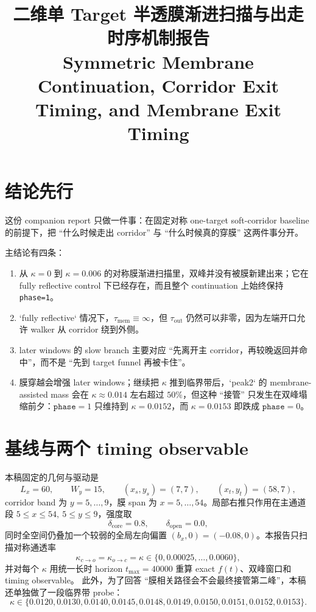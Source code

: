 \documentclass[11pt,fontset=fandol]{ctexart}
\title{二维单 Target 半透膜渐进扫描与出走时序机制报告\\\large Symmetric Membrane Continuation, Corridor Exit Timing, and Membrane Exit Timing}
\author{}
\date{}
\begin{document}
\maketitle

\section*{结论先行}
这份 companion report 只做一件事：在固定对称 one-target soft-corridor baseline 的前提下，把 ``什么时候走出 corridor'' 与 ``什么时候真的穿膜'' 这两件事分开。

主结论有四条：
\begin{enumerate}
  \item 从 \(\kappa=0\) 到 \(\kappa=0.006\) 的对称膜渐进扫描里，双峰并没有被膜新建出来；它在 fully reflective control 下已经存在，而且整个 continuation 上始终保持 \texttt{phase=1}。
  \item `fully reflective` 情况下，\(\tau_{\mathrm{mem}}\equiv\infty\)，但 \(\tau_{\mathrm{out}}\) 仍然可以非零，因为左端开口允许 walker 从 corridor 绕到外侧。
  \item later windows 的 slow branch 主要对应 ``先离开主 corridor，再较晚返回并命中''，而不是 ``先到 target funnel 再被卡住''。
  \item 膜穿越会增强 later windows；继续把 \(\kappa\) 推到临界带后，`peak2` 的 membrane-assisted mass 会在 \(\kappa\approx 0.014\) 左右超过 \(50\%\)，但这种 ``接管'' 只发生在双峰塌缩前夕：\(\texttt{phase}=1\) 只维持到 \(\kappa=0.0152\)，而 \(\kappa=0.0153\) 即跌成 \(\texttt{phase}=0\)。
\end{enumerate}

\section{基线与两个 timing observable}
本稿固定的几何与驱动是
\[
L_x=60,\qquad W_y=15,\qquad (x_s,y_s)=(7,7),\qquad (x_t,y_t)=(58,7),
\]
corridor band 为 \(y=5,\dots,9\)，膜 span 为 \(x=5,\dots,54\)。局部右推只作用在主通道段 \(5\le x\le 54,\ 5\le y\le 9\)，强度取
\[
\delta_{\mathrm{core}}=0.8,\qquad \delta_{\mathrm{open}}=0.0,
\]
同时全空间仍叠加一个较弱的全局左向偏置 \((b_x,0)=(-0.08,0)\)。本报告只扫描对称通透率
\[
\kappa_{c\to o}=\kappa_{o\to c}=\kappa\in\{0,0.00025,\dots,0.0060\},
\]
并对每个 \(\kappa\) 用统一长时 horizon \(t_{\max}=40000\) 重算 exact \(f(t)\)、双峰窗口和 timing observable。
此外，为了回答 ``膜相关路径会不会最终接管第二峰''，本稿还单独做了一段临界带 probe：
\[
\kappa\in\{0.0120,0.0130,0.0140,0.0145,0.0148,0.0149,0.0150,0.0151,0.0152,0.0153\}.
\]
\end{document}
